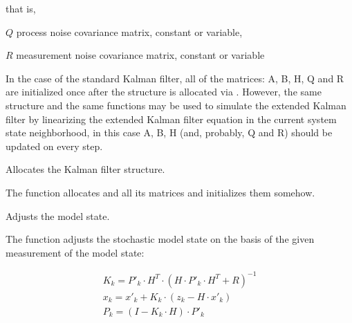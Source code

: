 that is,

$Q$ process noise covariance matrix, constant or variable,

$R$ measurement noise covariance matrix, constant or variable

In the case of the standard Kalman filter, all of the matrices: A, B, H, Q and R are initialized once after the  structure is allocated via . However, the same structure and the same functions may be used to simulate the extended Kalman filter by linearizing the extended Kalman filter equation in the current system state neighborhood, in this case A, B, H (and, probably, Q and R) should be updated on every step.

Allocates the Kalman filter structure.



\begin{description}
\end{description}

The function allocates  and all its matrices and initializes them somehow.


Adjusts the model state.


\begin{description}
\ifC
{}
\else
{}
\fi
{}
\end{description}

The function adjusts the stochastic model state on the basis of the given measurement of the model state:

\[
\begin{array}{l}
K_k=P'_k \cdot H^T \cdot (H \cdot P'_k \cdot H^T+R)^{-1}\\
x_k=x'_k+K_k \cdot (z_k-H \cdot x'_k)\\
P_k=(I-K_k \cdot H) \cdot P'_k
\end{array}
\]

